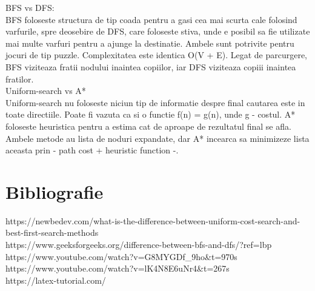 \documentclass[a4paper,18pt]{article}
\begin{document}
\tab BFS vs DFS:
\newline 
\\ \indent BFS foloseste structura de tip coada pentru a gasi cea mai scurta cale folosind varfurile, spre deosebire de DFS, care foloseste stiva, unde e posibil sa fie utilizate mai multe varfuri pentru a ajunge la destinatie. Ambele sunt potrivite pentru jocuri de tip puzzle. Complexitatea este identica O(V + E). Legat de parcurgere, BFS viziteaza fratii nodului inaintea copiilor, iar DFS viziteaza copiii inaintea fratilor. 
\newline 
\\ \indent Uniform-search vs A*
\newline 
\\ \indent Uniform-search nu foloseste niciun tip de informatie despre final cautarea este in toate directiile. Poate fi vazuta ca si o functie f(n) = g(n), unde g - costul. A* foloseste heuristica pentru a estima cat de aproape de rezultatul final se afla. Ambele metode au lista de noduri expandate, dar A* incearca sa minimizeze lista aceasta prin - path cost + heuristic function -.

\newpage
\section{ Bibliografie}

\tab https://newbedev.com/what-is-the-difference-between-uniform-cost-search-and-best-first-search-methods
\newline 
\\ \indent https://www.geeksforgeeks.org/difference-between-bfs-and-dfs/?ref=lbp
\newline 
\\ \indent https://www.youtube.com/watch?v=G8MYGDf\_9ho\&t=970s
\newline 
\\ \indent https://www.youtube.com/watch?v=lK4N8E6uNr4\&t=267s
\newline 
\\ \indent https://latex-tutorial.com/
\end{document}
